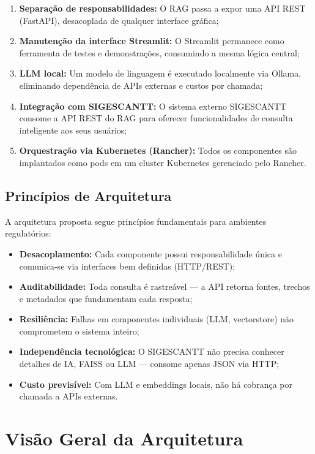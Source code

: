 \documentclass[12pt, a4paper]{article}
\begin{document}
\begin{enumerate}[label=\textbf{\arabic*.}]
  \item \textbf{Separação de responsabilidades:} O RAG passa a expor uma API REST (FastAPI), desacoplada de qualquer interface gráfica;
  \item \textbf{Manutenção da interface Streamlit:} O Streamlit permanece como ferramenta de testes e demonstrações, consumindo a mesma lógica central;
  \item \textbf{LLM local:} Um modelo de linguagem é executado localmente via Ollama, eliminando dependência de APIs externas e custos por chamada;
  \item \textbf{Integração com SIGESCANTT:} O sistema externo SIGESCANTT consome a API REST do RAG para oferecer funcionalidades de consulta inteligente aos seus usuários;
  \item \textbf{Orquestração via Kubernetes (Rancher):} Todos os componentes são implantados como pods em um cluster Kubernetes gerenciado pelo Rancher.
\end{enumerate}

\subsection{Princípios de Arquitetura}

A arquitetura proposta segue princípios fundamentais para ambientes regulatórios:

\begin{itemize}
  \item \textbf{Desacoplamento:} Cada componente possui responsabilidade única e comunica-se via interfaces bem definidas (HTTP/REST);
  \item \textbf{Auditabilidade:} Toda consulta é rastreável --- a API retorna fontes, trechos e metadados que fundamentam cada resposta;
  \item \textbf{Resiliência:} Falhas em componentes individuais (LLM, vectorstore) não comprometem o sistema inteiro;
  \item \textbf{Independência tecnológica:} O SIGESCANTT não precisa conhecer detalhes de IA, FAISS ou LLM --- consome apenas JSON via HTTP;
  \item \textbf{Custo previsível:} Com LLM e embeddings locais, não há cobrança por chamada a APIs externas.
\end{itemize}

\section{Visão Geral da Arquitetura}
\end{document}
